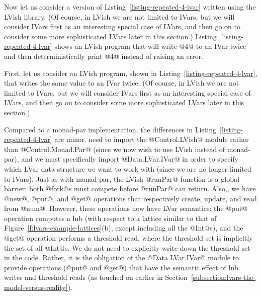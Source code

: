 \singlespacing

\doublespacing

Now let us consider a version of Listing~\ref{listing-repeated-4-ivar}
written using the LVish library. (Of course, in LVish we are not
limited to IVars, but we will consider IVars first as an interesting
special case of LVars, and then go on to consider some more
sophisticated LVars later in this section.)
Listing~\ref{listing-repeated-4-lvar} shows an LVish program that will
write @4@ to an IVar twice and then deterministically print @4@
instead of raising an error.
\fi

\ifdefined\JOURNAL
First, let us consider an LVish program, shown in
Listing~\ref{listing-repeated-4-lvar}, that writes the same value to
an IVar twice.  (Of course, in LVish we are not limited to IVars, but
we will consider IVars first as an interesting special case of LVars,
and then go on to consider some more sophisticated LVars later in this
section.)
\fi

\singlespacing

\doublespacing

\ifdefined\JOURNAL
Compared to a monad-par implementation, the differences in
Listing~\ref{listing-repeated-4-lvar} are minor.
\fi
{} need to
import the @Control.LVish@ module rather than @Control.Monad.Par@
(since we now wish to use LVish instead of monad-par), and we must
specifically import @Data.LVar.IVar@ in order to specify which LVar
data structure we want to work with (since we are no longer limited to
IVars).  Just as with monad-par, the LVish @runPar@ function is a
global barrier: both @fork@s must compete before @runPar@ can return.
Also,, we have @new@, @put@, and
@get@ operations that respectively create, update, and read from
@num@.  However, these operations now have LVar semantics: the @put@
operation computes a lub (with respect to a lattice similar to that of
Figure~\ref{f:lvars-example-lattices}(b), except including all the
@Int@s), and the @get@ operation performs a threshold read, where the
threshold set is implicitly the set of all @Int@s.  We do not need to
explicitly write down the threshold set in the code.  Rather, it is the
obligation of the @Data.LVar.IVar@ module to provide operations (@put@
and @get@) that have the semantic effect of lub writes and threshold
reads (as  touched on earlier in
Section~\ref{subsection:lvars-the-model-versus-reality}).

